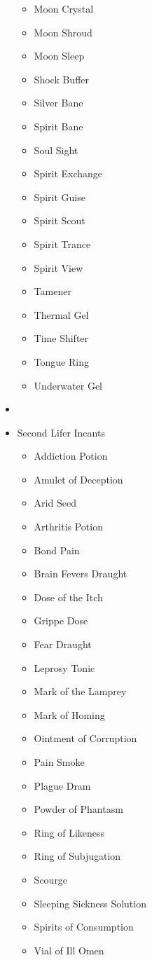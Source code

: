 \begin{itemize}[leftmargin=0pt]
\begin{itemize}[leftmargin=0pt]
		\item[] Moon Crystal
		\item[] Moon Shroud
		\item[] Moon Sleep
		\item[] Shock Buffer
		\item[] Silver Bane
		\item[] Spirit Bane
		\item[] Soul Sight
		\item[] Spirit Exchange
		\item[] Spirit Guise
		\item[] Spirit Scout
		\item[] Spirit Trance
		\item[] Spirit View
		\item[] Tamener
		\item[] Thermal Gel
		\item[] Time Shifter
		\item[] Tongue Ring
		\item[] Underwater Gel
	\end{itemize}
	\item[] 
	\item[] Second Lifer Incants
	\begin{itemize}[leftmargin=0pt]
		\item[] Addiction Potion
		\item[] Amulet of Deception
		\item[] Arid Seed
		\item[] Arthritis Potion
		\item[] Bond Pain
		\item[] Brain Fevers Draught
		\item[] Dose of the Itch
		\item[] Grippe Dose
		\item[] Fear Draught
		\item[] Leprosy Tonic
		\item[] Mark of the Lamprey
		\item[] Mark of Homing
		\item[] Ointment of Corruption
		\item[] Pain Smoke
		\item[] Plague Dram
		\item[] Powder of Phantasm
		\item[] Ring of Likeness
		\item[] Ring of Subjugation
		\item[] Scourge
		\item[] Sleeping Sickness Solution
		\item[] Spirits of Consumption
		\item[] Vial of Ill Omen 
	\end{itemize}
\end{itemize}
\pagebreak
